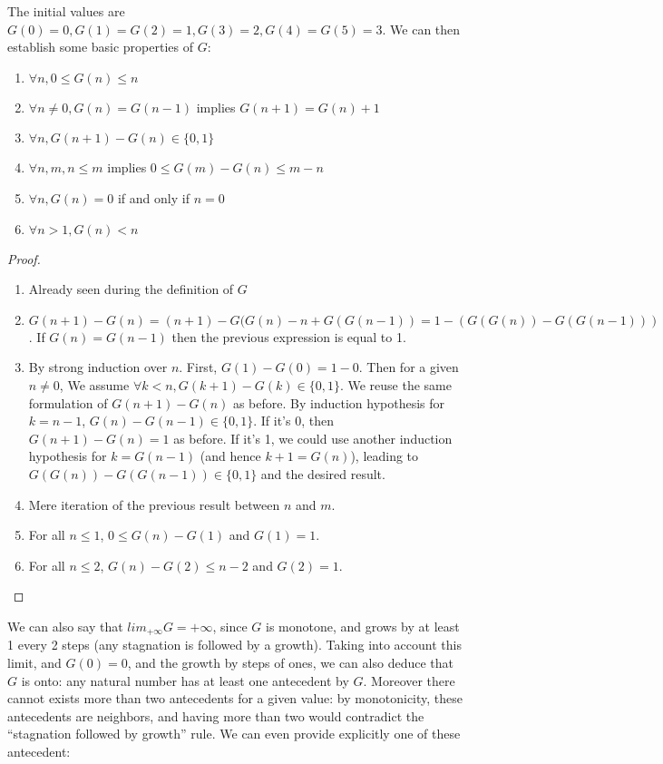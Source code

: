 \documentclass[a4paper,11pt]{article}
\begin{document}
The initial values are $G(0)=0, G(1)=G(2)=1, G(3)=2, G(4)=G(5)=3$.
We can then establish some basic properties of $G$:
\begin{theorem}\label{Gprops}
\noindent
\begin{enumerate}
\item $\forall n, 0 \le G(n) \le n$
\item $\forall n\neq 0, G(n)=G(n-1)$ implies $G(n+1)=G(n)+1$
\item $\forall n, G(n+1)-G(n) \in \{0,1\}$
\item $\forall n,m, n\le m$ implies $0 \le G(m)-G(n) \le m-n$
\item $\forall n, G(n)=0$ if and only if $n=0$
\item $\forall n>1, G(n)<n$
\end{enumerate}
\end{theorem}
\begin{proof}
\noindent
\begin{enumerate}
\item Already seen during the definition of $G$
\item $G(n+1)-G(n) = (n+1)-G(G(n)-n+G(G(n-1)) = 1 - (G(G(n))-G(G(n-1)))$.
If $G(n)=G(n-1)$ then the previous expression is equal to 1.
\item By strong induction over $n$. First, $G(1)-G(0)=1-0$. Then
for a given $n\neq 0$, We assume $\forall k<n, G(k+1)-G(k) \in \{0,1\}$.
We reuse the same formulation of $G(n+1)-G(n)$ as before.
By induction hypothesis for $k=n-1$, $G(n)-G(n-1) \in\{0,1\}$.
If it's 0, then $G(n+1)-G(n) = 1$ as before. If it's 1, we could use another
induction hypothesis for $k=G(n-1)$ (and hence $k+1 = G(n)$), leading
to $G(G(n))-G(G(n-1)) \in \{0,1\}$ and the desired result.
\item Mere iteration of the previous result between $n$ and $m$.
\item For all $n\le1$, $0 \le G(n)-G(1)$ and $G(1)=1$.
\item For all $n\le2$, $G(n)-G(2) \le n-2$ and $G(2)=1$.
\end{enumerate}
\end{proof}

We can also say that $lim_{+\infty} G = +\infty$, since $G$ is
monotone, and grows by at least 1 every 2 steps (any stagnation
is followed by a growth). Taking into account this limit, and
$G(0)=0$, and the growth by steps of ones, we can also deduce
that $G$ is onto: any natural number has at least one antecedent
by $G$. Moreover there cannot exists more than two antecedents
for a given value: by monotonicity, these antecedents are neighbors,
and having more than two would contradict the ``stagnation followed
by growth'' rule.
We can even provide explicitly one of these antecedent:
\end{document}
